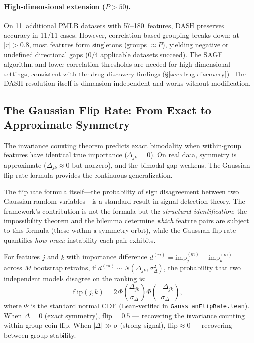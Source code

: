 \documentclass[11pt,a4paper]{article}
\begin{document}
\paragraph{High-dimensional extension ($P > 50$).}
On 11~additional PMLB datasets with 57--180~features, DASH preserves
accuracy in 11/11 cases.  However, correlation-based grouping breaks
down: at $|r| > 0.8$, most features form singletons (groups $\approx
P$), yielding negative or undefined directional gaps (0/4 applicable
datasets succeed).  The SAGE algorithm and lower correlation thresholds
are needed for high-dimensional settings, consistent with the drug
discovery findings (\S\ref{sec:drug-discovery}).  The DASH resolution
itself is dimension-independent and works without modification.

\subsection{The Gaussian Flip Rate: From Exact to Approximate Symmetry}
\label{sec:gaussian-flip}

The invariance counting theorem predicts exact bimodality when within-group
features have identical true importance ($\Delta_{jk} = 0$).  On real data,
symmetry is approximate ($\Delta_{jk} \approx 0$ but nonzero), and the
bimodal gap weakens.  The Gaussian flip rate formula provides the continuous
generalization.

The flip rate formula itself---the probability of sign disagreement between two Gaussian random variables---is a standard result in signal detection theory. The framework's contribution is not the formula but the \emph{structural identification}: the impossibility theorem and the bilemma determine \emph{which} feature pairs are subject to this formula (those within a symmetry orbit), while the Gaussian flip rate quantifies \emph{how much} instability each pair exhibits.

For features $j$ and $k$ with importance difference
$d^{(m)} = \text{imp}_j^{(m)} - \text{imp}_k^{(m)}$ across $M$ bootstrap
retrains, if $d^{(m)} \sim N(\Delta_{jk}, \sigma^2_\Delta)$, the probability
that two independent models disagree on the ranking is:
\begin{equation}
  \text{flip}(j,k) = 2\,\Phi\!\left(\frac{\Delta_{jk}}{\sigma_\Delta}\right)
  \Phi\!\left(\frac{-\Delta_{jk}}{\sigma_\Delta}\right),
  \label{eq:gaussian-flip}
\end{equation}
where $\Phi$ is the standard normal CDF (Lean-verified in
\texttt{GaussianFlipRate.lean}).  When $\Delta = 0$ (exact symmetry),
$\text{flip} = 0.5$ --- recovering the invariance counting within-group coin flip.
When $|\Delta| \gg \sigma$ (strong signal), $\text{flip} \approx 0$ ---
recovering between-group stability.
\end{document}
